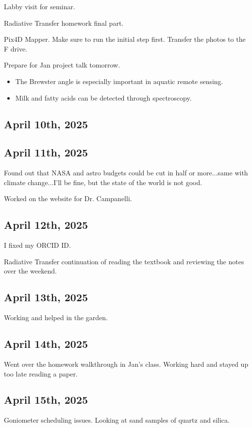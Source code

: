 \documentclass{article}
\begin{document}

Labby visit for seminar. 

Radiative Transfer homework final part. 

Pix4D Mapper. 
Make sure to run the initial step first. Transfer the photos to the F drive.

Prepare for Jan project talk tomorrow. 

\begin{itemize}
    \item The Brewster angle is especially important in aquatic remote sensing. 
    \item Milk and fatty acids can be detected through spectroscopy.
\end{itemize}



\subsection{April 10th, 2025}

\subsection{April 11th, 2025}
Found out that NASA and astro budgets could be cut in half or more...same with climate change...I'll be fine, but the state of the world is not good.

Worked on the website for Dr. Campanelli. 
\subsection{April 12th, 2025}
I fixed my ORCID ID. 

Radiative Transfer continuation of reading the textbook and reviewing the notes over the weekend. 

\subsection{April 13th, 2025}
Working and helped in the garden. 

\subsection{April 14th, 2025}
Went over the homework walkthrough in Jan's class. Working hard and stayed up too late reading a paper. 



\subsection{April 15th, 2025}
Goniometer scheduling issues. Looking at sand samples of quartz and silica. 
\end{document}
